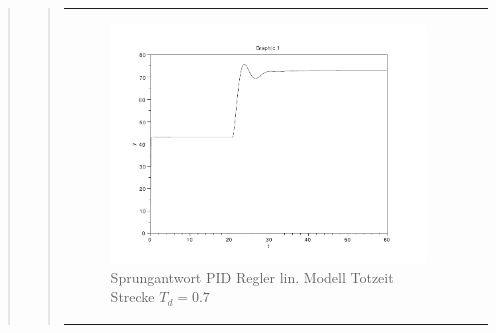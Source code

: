 \begin{quote}
\begin{quote}
\begin{center}
\begin{tabular}{ll}
                    \begin{minipage}{0.6\textwidth}
                        \begin{figure}[H]
                            \includegraphics[scale=0.4,trim = 0cm 0cm 0cm
                            0cm, clip]
                            {./Bilder/4_5_Td_04_KposI}
                              \caption{Sprungantwort PID Regler lin. Modell Totzeit Strecke $T_d = 0.7$ }
                        \end{figure}
                    \end{minipage}
                
                \end{tabular}
            \end{center} 
        
    \end{quote}
    
    
    
\end{quote}



